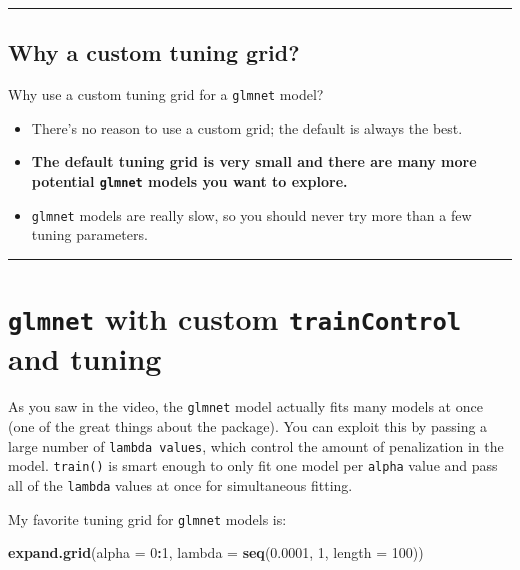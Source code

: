 \documentclass[]{book}
\newenvironment{Shaded}{\begin{snugshade}}{\end{snugshade}}
\newcommand{\KeywordTok}[1]{\textcolor[rgb]{0.13,0.29,0.53}{\textbf{#1}}}
\newcommand{\DataTypeTok}[1]{\textcolor[rgb]{0.13,0.29,0.53}{#1}}
\newcommand{\DecValTok}[1]{\textcolor[rgb]{0.00,0.00,0.81}{#1}}
\newcommand{\FloatTok}[1]{\textcolor[rgb]{0.00,0.00,0.81}{#1}}
\newcommand{\OperatorTok}[1]{\textcolor[rgb]{0.81,0.36,0.00}{\textbf{#1}}}
\newcommand{\NormalTok}[1]{#1}
\begin{document}
\begin{center}\rule{0.5\linewidth}{\linethickness}\end{center}

\subsection*{Why a custom tuning grid?}\label{why-a-custom-tuning-grid}

Why use a custom tuning grid for a \texttt{glmnet} model?

\begin{itemize}
\item
  There's no reason to use a custom grid; the default is always the
  best.
\item
  \textbf{The default tuning grid is very small and there are many more
  potential \texttt{glmnet} models you want to explore.}
\item
  \texttt{glmnet} models are really slow, so you should never try more
  than a few tuning parameters.
\end{itemize}

\begin{center}\rule{0.5\linewidth}{\linethickness}\end{center}

\section{\texorpdfstring{\texttt{glmnet} with custom
\texttt{trainControl} and
tuning}{glmnet with custom trainControl and tuning}}\label{glmnet-with-custom-traincontrol-and-tuning}

As you saw in the video, the \texttt{glmnet} model actually fits many
models at once (one of the great things about the package). You can
exploit this by passing a large number of \texttt{lambda\ values}, which
control the amount of penalization in the model. \texttt{train()} is
smart enough to only fit one model per \texttt{alpha} value and pass all
of the \texttt{lambda} values at once for simultaneous fitting.

My favorite tuning grid for \texttt{glmnet} models is:

\begin{Shaded}
\begin{Highlighting}[]
\KeywordTok{expand.grid}\NormalTok{(}\DataTypeTok{alpha =} \DecValTok{0}\OperatorTok{:}\DecValTok{1}\NormalTok{,}
            \DataTypeTok{lambda =} \KeywordTok{seq}\NormalTok{(}\FloatTok{0.0001}\NormalTok{, }\DecValTok{1}\NormalTok{, }\DataTypeTok{length =} \DecValTok{100}\NormalTok{))}
\end{Highlighting}
\end{Shaded}
\end{document}
